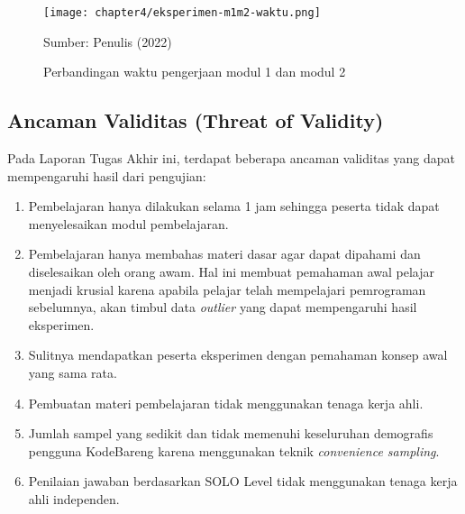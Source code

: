 \begin{figure}[H]
  \centering
  \texttt{[image: chapter4/eksperimen-m1m2-waktu.png]}
  \caption{Perbandingan waktu pengerjaan modul 1 dan modul 2} \label{fig:eksperimen-m1m2-waktu}
  Sumber: Penulis (2022)
\end{figure}

\subsection{Ancaman Validitas (Threat of Validity)}

Pada Laporan Tugas Akhir ini, terdapat beberapa ancaman validitas yang dapat mempengaruhi hasil dari pengujian:
\begin{enumerate}
  \item Pembelajaran hanya dilakukan selama 1 jam sehingga peserta tidak dapat menyelesaikan modul pembelajaran.
  \item Pembelajaran hanya membahas materi dasar agar dapat dipahami dan diselesaikan oleh orang awam. Hal ini membuat pemahaman awal pelajar menjadi krusial karena apabila pelajar telah mempelajari pemrograman sebelumnya, akan timbul data \textit{outlier} yang dapat mempengaruhi hasil eksperimen.
  \item Sulitnya mendapatkan peserta eksperimen dengan pemahaman konsep awal yang sama rata.
  \item Pembuatan materi pembelajaran tidak menggunakan tenaga kerja ahli.
  \item Jumlah sampel yang sedikit dan tidak memenuhi keseluruhan demografis pengguna KodeBareng karena menggunakan teknik \textit{convenience sampling}.
  \item Penilaian jawaban berdasarkan SOLO Level tidak menggunakan tenaga kerja ahli independen.
\end{enumerate}